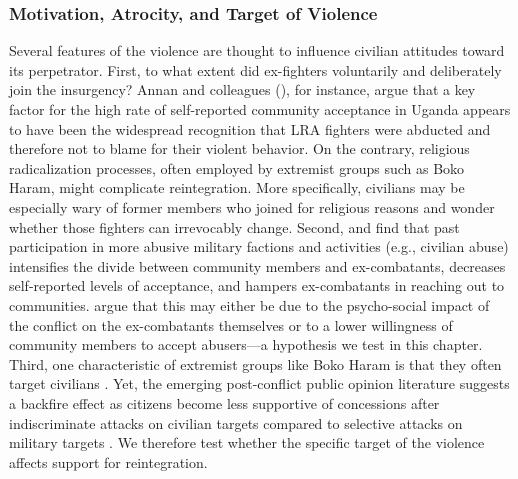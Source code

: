 \subsubsection{Motivation, Atrocity, and Target of Violence} 
Several features of the violence are thought to influence civilian attitudes toward its perpetrator. First, to what extent did ex-fighters voluntarily and deliberately join the insurgency? Annan and colleagues (\citeyear{Annan2006}), for instance, argue that a key factor for the high rate of self-reported community acceptance in Uganda appears to have been the widespread recognition that LRA fighters were abducted and therefore not to blame for their violent behavior. On the contrary, religious radicalization processes, often employed by extremist groups such as Boko Haram, might complicate reintegration. More specifically, civilians may be especially wary of former members who joined for religious reasons and wonder whether those fighters can irrevocably change. Second, \cite{Humphreys2007} and \cite{Nussio2014} find that past participation in more abusive military factions and activities (e.g., civilian abuse) intensifies the divide between community members and ex-combatants, decreases self-reported levels of acceptance, and hampers ex-combatants in reaching out to communities. \cite{Humphreys2007} argue that this may either be due to the psycho-social impact of the conflict on the ex-combatants themselves or to a lower willingness of community members to accept abusers---a hypothesis we test in this chapter. Third, one characteristic of extremist groups like Boko Haram is that they often target civilians \citep{Asal2019}. Yet, the emerging post-conflict public opinion literature suggests a backfire effect as citizens become less supportive of concessions after indiscriminate attacks on civilian targets compared to selective attacks on military targets \citep[e.g.,][]{Balcells2018}. We therefore test whether the specific target of the violence affects support for reintegration.


